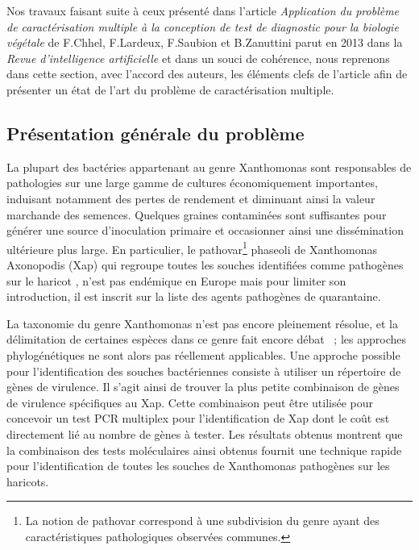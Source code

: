 Nos travaux faisant suite à ceux présenté dans l'article\cite{Chhel2013} \emph{Application du problème de caractérisation multiple à la conception de test de diagnostic pour la biologie végétale} de F.Chhel, F.Lardeux, F.Saubion et B.Zanuttini parut en 2013 dans la \emph{Revue d'intelligence artificielle}  et dans un souci de cohérence, nous reprenons dans cette section, avec l'accord des auteurs, les éléments clefs de l'article afin de présenter un état de l'art du problème de caractérisation multiple.
 
\subsection{Présentation générale du problème}
La plupart des bactéries appartenant au genre Xanthomonas sont responsables de pathologies sur une large gamme de cultures économiquement importantes,  induisant notamment  des pertes de rendement et diminuant ainsi la valeur marchande des semences. Quelques graines contaminées sont suffisantes pour générer une source d'inoculation primaire et occasionner ainsi une dissémination ultérieure plus large. En particulier, le pathovar\footnote{La notion de pathovar correspond à une subdivision du genre ayant des caractéristiques pathologiques observées communes.} phaseoli de  Xanthomonas Axonopodis (Xap) qui regroupe toutes les souches identifiées comme pathogènes sur le haricot \cite{Vauterin1995}, n'est pas endémique en Europe mais pour limiter son introduction, il est inscrit sur la liste des agents pathogènes de quarantaine.

La taxonomie du genre Xanthomonas n'est pas encore pleinement résolue, et la délimitation de certaines espèces dans ce genre fait encore débat \cite{Schaad2005}~; les approches phylogénétiques ne sont alors pas réellement applicables. Une approche possible pour l'identification des souches bactériennes consiste à utiliser un répertoire de gènes de virulence. Il s'agit ainsi de trouver la plus petite combinaison de gènes de virulence spécifiques au Xap. Cette combinaison peut être utilisée pour concevoir un test PCR multiplex pour l'identification de Xap \cite{Boureau2013,Boureau2012} dont le coût est directement lié au nombre de gènes à tester. Les résultats obtenus
montrent que la combinaison des tests moléculaires ainsi obtenus fournit une technique rapide pour l'identification de toutes les souches de Xanthomonas pathogènes sur les haricots.

